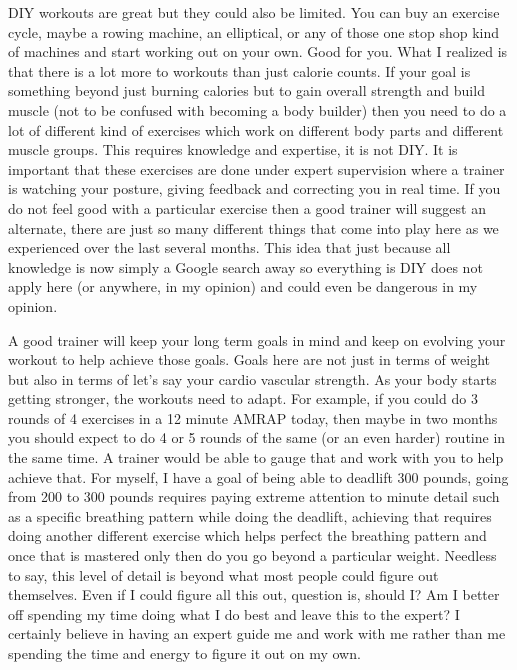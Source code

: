 \documentclass[
  oneside]{book}
\begin{document}
DIY workouts are great but they could also be limited. You can buy an exercise cycle, maybe a rowing machine, an elliptical, or any of those one stop shop kind of machines and start working out on your own. Good for you. What I realized is that there is a lot more to workouts than just calorie counts. If your goal is something beyond just burning calories but to gain overall strength and build muscle (not to be confused with becoming a body builder) then you need to do a lot of different kind of exercises which work on different body parts and different muscle groups. This requires knowledge and expertise, it is not DIY. It is important that these exercises are done under expert supervision where a trainer is watching your posture, giving feedback and correcting you in real time. If you do not feel good with a particular exercise then a good trainer will suggest an alternate, there are just so many different things that come into play here as we experienced over the last several months. This idea that just because all knowledge is now simply a Google search away so everything is DIY does not apply here (or anywhere, in my opinion) and could even be dangerous in my opinion.

A good trainer will keep your long term goals in mind and keep on evolving your workout to help achieve those goals. Goals here are not just in terms of weight but also in terms of let's say your cardio vascular strength. As your body starts getting stronger, the workouts need to adapt. For example, if you could do 3 rounds of 4 exercises in a 12 minute AMRAP today, then maybe in two months you should expect to do 4 or 5 rounds of the same (or an even harder) routine in the same time. A trainer would be able to gauge that and work with you to help achieve that. For myself, I have a goal of being able to deadlift 300 pounds, going from 200 to 300 pounds requires paying extreme attention to minute detail such as a specific breathing pattern while doing the deadlift, achieving that requires doing another different exercise which helps perfect the breathing pattern and once that is mastered only then do you go beyond a particular weight. Needless to say, this level of detail is beyond what most people could figure out themselves. Even if I could figure all this out, question is, should I? Am I better off spending my time doing what I do best and leave this to the expert? I certainly believe in having an expert guide me and work with me rather than me spending the time and energy to figure it out on my own.
\end{document}
